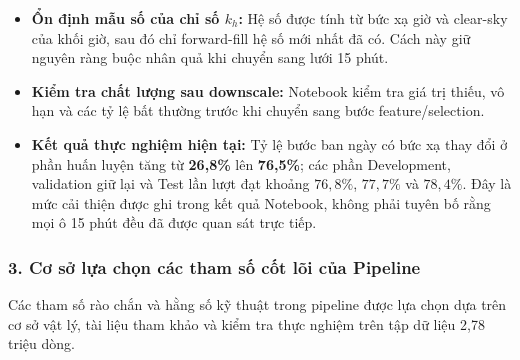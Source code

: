 \documentclass[12pt,a4paper]{article}
\begin{document}
\begin{enumerate}
    \begin{itemize}
\item \textbf{Ổn định mẫu số của chỉ số $k_h$:} Hệ số được tính từ bức xạ giờ và clear-sky của khối giờ, sau đó chỉ forward-fill hệ số mới nhất đã có. Cách này giữ nguyên ràng buộc nhân quả khi chuyển sang lưới 15 phút.
\end{itemize}
    \begin{itemize}
\item \textbf{Kiểm tra chất lượng sau downscale:} Notebook kiểm tra giá trị thiếu, vô hạn và các tỷ lệ bất thường trước khi chuyển sang bước feature/selection.
\end{itemize}
    \begin{itemize}
\item \textbf{Kết quả thực nghiệm hiện tại:} Tỷ lệ bước ban ngày có bức xạ thay đổi ở phần huấn luyện tăng từ \textbf{26{,}8\%} lên \textbf{76{,}5\%}; các phần Development, validation giữ lại và Test lần lượt đạt khoảng $76{,}8\%$, $77{,}7\%$ và $78{,}4\%$. Đây là mức cải thiện được ghi trong kết quả Notebook, không phải tuyên bố rằng mọi ô 15 phút đều đã được quan sát trực tiếp.
\end{itemize}
\end{enumerate}

\subsubsection{3. Cơ sở lựa chọn các tham số cốt lõi của Pipeline}
Các tham số rào chắn và hằng số kỹ thuật trong pipeline được lựa chọn dựa trên cơ sở vật lý, tài liệu tham khảo và kiểm tra thực nghiệm trên tập dữ liệu 2,78 triệu dòng.
\end{document}
